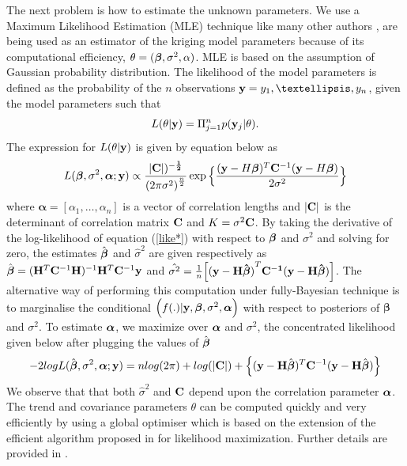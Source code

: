 The next problem is how to estimate the unknown parameters. We use a Maximum Likelihood Estimation (MLE) technique like many other authors \citep{pd5,pd28}, are being used as an estimator of the kriging model parameters because of its computational efficiency, $\theta=({\boldsymbol{\beta}},\sigma^2,\boldmath \alpha)$. MLE is based on the assumption of Gaussian probability distribution. 
The likelihood of the model parameters is defined as the probability of the $n$ observations $\by= {y_1, …, y_n}$, given the model parameters such that 
\begin{equation}
L(\theta|{\bf y})= \Pi_{j=1}^n p({\bf y}_j|\theta).
\end{equation}
The expression for $L(\theta|{\bf y})$ is given by equation below as
\begin{equation}\label{like*}
L(\boldsymbol \beta, \sigma^2, \boldsymbol{\alpha};{\bf y})\propto \frac{|\bf C|)^{-\frac{1}{2}}}{{(2\pi\sigma^2)}^\frac{n}{2}}\exp \Big \{\frac{({\bf y}-H\boldsymbol \beta)^T {\bf C}^{-1}({\bf y}-H\boldsymbol \beta)}{2\sigma^2}\Big\}
\end{equation}
where $\boldsymbol{\alpha}=[\alpha_1, \ldots, \alpha_n]$ is a vector of correlation lengths and $|{\bf C}|$ is the determinant of correlation matrix ${\bf C}$ and $K = \sigma^2{\bf C}$.
By taking the derivative of the log-likelihood of equation (\ref{like*}) with
respect to ${\boldsymbol{\beta}}$ and $\sigma^2$ and solving for zero, the estimates ${\hat{\boldsymbol{\beta}}}$ and $\hat\sigma^2$ are given respectively as ${\hat{\boldsymbol{\beta}}}=({\bf H}^T{\bf C}^{-1}{\bf H})^{-1}{\bf H}^T{\bf C}^{-1}{\bf y}$ and $\hat{\sigma^2}=\frac{1}{n}\Big[\mathbf{(y-H\hat{\boldsymbol \beta})}^T\bf C^{-1}(\bf y-H\hat{\boldsymbol \beta})\Big]$. The alternative way of performing this computation under fully-Bayesian technique is to marginalise the conditional $\Big(f(.) | {\bf y}, \boldsymbol \beta, \sigma^2, \boldsymbol{\alpha}\Big)$ with respect to posteriors of $\boldsymbol \beta$ and $\sigma^2$. To estimate ${\boldsymbol{\alpha}}$, we maximize over ${\boldsymbol{\alpha}}$ and $\sigma^2$, the concentrated likelihood given below after plugging the values of ${\hat{\boldsymbol{\beta}}}$ 
\begin{equation}
-2 log L({\hat{\boldsymbol{\beta}}},\sigma^2, {\boldsymbol{\alpha}}; {\bf y}) = n log(2\pi) +  log(|{\bf C}|) + \Big \{({\bf y}-{\bf H} {\hat{\boldsymbol{\beta}}})^T {\bf C}^{-1}({\bf y}-{\bf H} {\hat{\boldsymbol{\beta}}})\Big\}
\end{equation}
We observe that that both $\hat\sigma^2$ and ${\bf C}$ depend upon the correlation parameter ${\boldsymbol{\alpha}}$. The trend and covariance parameters $\theta$ can be computed quickly and very efficiently by using a global optimiser which is based on the extension of the efficient algorithm proposed in \citet{pd9} for likelihood maximization. Further details are provided in \citep{pd8}.

